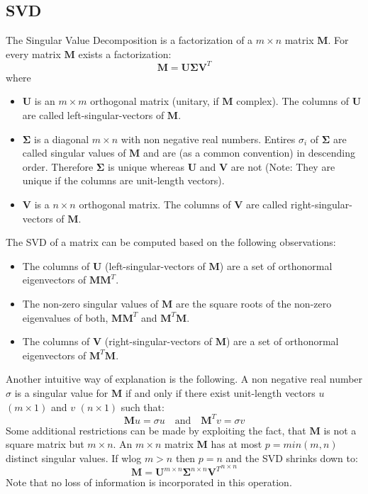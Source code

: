 \documentclass[10pt]{article}
\begin{document}
\subsection{SVD}
The Singular Value Decomposition is a factorization of a $m\!\times\! n$ matrix $\mathbf{M}$. For every matrix $\mathbf{M}$ exists a factorization:
\begin{equation}
	\mathbf{M} = \mathbf{U}\mathbf{\Sigma}\mathbf{V}^T
\end{equation}
where
\begin{itemize}
	\item $\mathbf{U}$ is an $m\!\times\! m$ orthogonal matrix (unitary, if $\mathbf{M}$ complex). The columns of $\mathbf{U}$ are called left-singular-vectors of $\mathbf{M}$.
	\item $\mathbf{\Sigma}$ is a diagonal $m\!\times\! n$ with non negative real numbers. Entires $\sigma_i$ of $\mathbf{\Sigma}$ are called singular values of  $\mathbf{M}$ and are (as a common convention) in descending order. Therefore $\mathbf{\Sigma}$ is unique whereas $\mathbf{U}$ and $\mathbf{V}$ are not (Note: They are unique if the columns are unit-length vectors).
	\item $\mathbf{V}$ is a $n\!\times\! n$ orthogonal matrix. The columns of $\mathbf{V}$ are called right-singular-vectors of $\mathbf{M}$.
\end{itemize}
The SVD of a matrix can be computed based on the following observations:
\begin{itemize}
	\item The columns of $\mathbf{U}$ (left-singular-vectors of $\mathbf{M}$) are a set of orthonormal eigenvectors of $\mathbf{M}\mathbf{M}^T$.
	\item The non-zero singular values of $\mathbf{M}$ are the square roots of the non-zero eigenvalues of both, $\mathbf{M}\mathbf{M}^T$ and $\mathbf{M}^T\mathbf{M}$.
	\item The columns of $\mathbf{V}$ (right-singular-vectors of $\mathbf{M}$) are a set of orthonormal eigenvectors of $\mathbf{M}^T\mathbf{M}$.
\end{itemize}
Another intuitive way of explanation is the following. A non negative real number $\sigma$ is a singular value for $\mathbf{M}$ if and only if there exist unit-length vectors $u$ $(m\!\times\! 1)$ and $v$ $(n\!\times\! 1)$ such that:
\begin{equation}
	\mathbf{M}u = \sigma u \quad\text{and}\quad \mathbf{M}^T v = \sigma v
\end{equation}
Some additional restrictions can be made by exploiting the fact, that $\mathbf{M}$ is not a square matrix but $m\!\times\! n$. An $m\!\times\! n$ matrix $\mathbf{M}$ has at most $p=min(m,n)$ distinct singular values. If wlog $m>n$ then $p=n$ and the SVD shrinks down to:
\begin{equation}
	\mathbf{M} = \mathbf{U}^{m\!\times\! n} \mathbf{\Sigma}^{n\!\times\! n} {\mathbf{V}^T}^{n\!\times\! n}
\end{equation}
Note that no loss of information is incorporated in this operation. 
\end{document}
